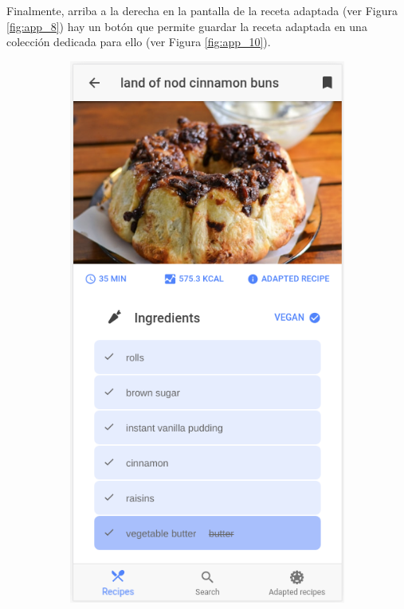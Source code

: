 Finalmente, arriba a la derecha en la pantalla de la receta adaptada (ver Figura \ref{fig:app_8}) hay un botón que permite guardar la receta adaptada en una colección dedicada para ello (ver Figura \ref{fig:app_10}).

\begin{figure}[H]
    \centering
    \begin{subfigure}[b]{0.32\linewidth}
        \includegraphics[width=\linewidth]{imagenes/app/pantallas/app_8.png}

\end{subfigure}
\end{figure}
